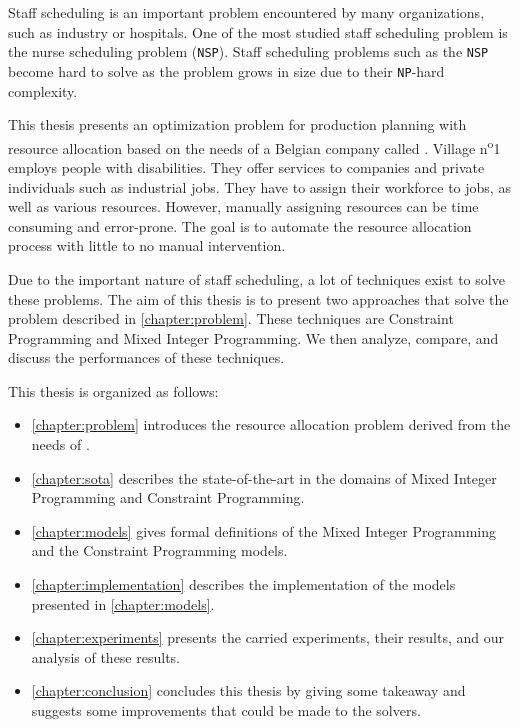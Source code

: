 \documentclass[../thesis.tex]{subfiles}
\begin{document}
Staff scheduling is an important problem encountered by many organizations, such as industry or hospitals.
One of the most studied staff scheduling problem is the nurse scheduling problem (\texttt{NSP}). 
Staff scheduling problems such as the \texttt{NSP} become hard to solve as the problem grows in size due to their \texttt{NP}-hard complexity.

This thesis presents an optimization problem for production planning with resource allocation based on the needs of a Belgian company called \vone.
Village n\textsuperscript{o}1 employs people with disabilities.
They offer services to companies and private individuals such as industrial jobs. They have to assign their 
workforce to jobs, as well as various resources. However, manually assigning resources can be time consuming and error-prone.
The goal is to automate the resource allocation process with little to no manual intervention.

Due to the important nature of staff scheduling, a lot of techniques exist to solve these problems. 
The aim of this thesis is to present two approaches that solve the problem described 
in \autoref{chapter:problem}. These techniques are Constraint Programming and Mixed Integer Programming.
We then analyze, compare, and discuss the performances of these techniques.



This thesis is organized as follows:

\begin{itemize}
  \item[] \autoref{chapter:problem} introduces the resource allocation problem derived from the needs of \vone.
  \item[] \autoref{chapter:sota} describes the state-of-the-art in the domains of Mixed Integer Programming and Constraint Programming. 
  \item[] \autoref{chapter:models} gives formal definitions of the Mixed Integer Programming and the Constraint Programming models.
  \item[] \autoref{chapter:implementation} describes the implementation of the models presented in \autoref{chapter:models}.
  \item[] \autoref{chapter:experiments} presents the carried experiments, their results, and our analysis of these results.
  \item[] \autoref{chapter:conclusion} concludes this thesis by giving some takeaway and suggests some improvements that could be made to the solvers.
\end{itemize}
\end{document}
